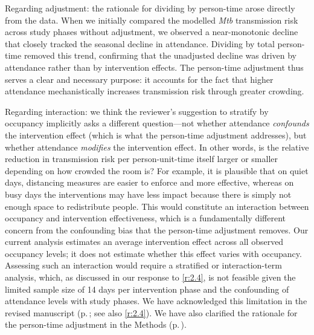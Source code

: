 \documentclass[11pt]{article}
\begin{document}
\begin{enumerate}[label=\textbf{R2.\arabic*.}, leftmargin=*]
{Regarding adjustment: the rationale for dividing by person-time arose directly from the data. When we initially compared the modelled \emph{Mtb} transmission risk across study phases without adjustment, we observed a near-monotonic decline that closely tracked the seasonal decline in attendance. Dividing by total person-time removed this trend, confirming that the unadjusted decline was driven by attendance rather than by intervention effects. The person-time adjustment thus serves a clear and necessary purpose: it accounts for the fact that higher attendance mechanistically increases transmission risk through greater crowding. 

Regarding interaction: we think the reviewer's suggestion to stratify by occupancy implicitly asks a different question---not whether attendance \textit{confounds} the intervention effect (which is what the person-time adjustment addresses), but whether attendance \textit{modifies} the intervention effect. In other words, is the relative reduction in transmission risk per person-unit-time itself larger or smaller depending on how crowded the room is? For example, it is plausible that on quiet days, distancing measures are easier to enforce and more effective, whereas on busy days the interventions may have less impact because there is simply not enough space to redistribute people. This would constitute an interaction between occupancy and intervention effectiveness, which is a fundamentally different concern from the confounding bias that the person-time adjustment removes. Our current analysis estimates an average intervention effect across all observed occupancy levels; it does not estimate whether this effect varies with occupancy. Assessing such an interaction would require a stratified or interaction-term analysis, which, as discussed in our response to \ref{r:2.4}, is not feasible given the limited sample size of 14 days per intervention phase and the confounding of attendance levels with study phases. We have acknowledged this limitation in the revised manuscript (p.\,\pageref{chg:R2.4}; see also \ref{r:2.4}). We have also clarified the rationale for the person-time adjustment in the Methods (p.\,\pageref{chg:R2.6}).}


\end{enumerate}
\end{document}
